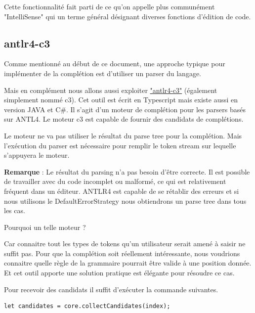 \documentclass[
    iict, %
    il, %
]{heig-tb}
\begin{document}



Cette fonctionnalité fait parti de ce qu'on appelle plus communément "IntelliSense" \cite{intelliSense} qui un terme général désignant diverses fonctions d'édition de code.


\subsection{antlr4-c3}

Comme mentionné au début de ce document, une approche typique pour implémenter de la complétion est d'utiliser un parser du langage.

Mais en complément nous allons aussi exploiter \href{https://github.com/mike-lischke/antlr4-c3}{"antlr4-c3"} (également simplement nommé c3).
Cet outil est écrit en Typescript mais existe aussi en version JAVA et C\#.
Il s'agit d'un moteur de complétion pour les parsers basés sur ANTL4. Le moteur c3 est capable de fournir des candidats de complétions.

Le moteur ne va pas utiliser le résultat du parse tree pour la complétion. Mais l'exécution du parser est nécessaire pour remplir le token stream sur lequelle s'appuyera le moteur.

\textbf{Remarque} : Le résultat du parsing n'a pas besoin d'être correcte. Il est possible de travailler avec du code incomplet ou malformé, ce qui est relativement fréquent dans un éditeur.
ANTLR4 est capable de se rétablir des erreurs et si nous utilisons le DefaultErrorStrategy nous obtiendrons un parse tree dans tous les cas.

Pourquoi un telle moteur ?

Car connaitre tout les types de tokens qu'un utilisateur serait amené à saisir ne suffit pas. Pour que la complétion soit réellement intéressante, nous voudrions connaitre quelle règle de la grammaire pourrait être valide à une position donnée.
Et cet outil apporte une solution pratique est élégante pour résoudre ce cas. %


Pour recevoir des candidats il suffit d'exécuter la commande suivantes.

\begin{lstlisting}[frame=single]
    let candidates = core.collectCandidates(index);
\end{lstlisting}
\end{document}
